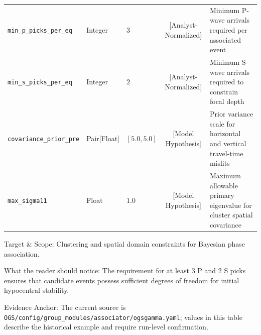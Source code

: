 \begin{table}[htbp]
\begin{threeparttable}
\begin{tabularx}{\linewidth}{l l l c X}
      \texttt{min\_p\_picks\_per\_eq} & Integer & $3$ & [Analyst-Normalized] & Minimum P-wave arrivals required per associated event \\
      \texttt{min\_s\_picks\_per\_eq} & Integer & $2$ & [Analyst-Normalized] & Minimum S-wave arrivals required to constrain focal depth \\
      \texttt{covariance\_prior\_pre} & Pair[Float] & $[5.0, 5.0]$ & [Model Hypothesis] & Prior variance scale for horizontal and vertical travel-time misfits \\
      \texttt{max\_sigma11} & Float & $1.0$ & [Model Hypothesis] & Maximum allowable primary eigenvalue for cluster spatial covariance \\
      \bottomrule
    \end{tabularx}
    \begin{tablenotes}[flushleft]
      \footnotesize
      \item Target \& Scope: Clustering and spatial domain constraints for Bayesian phase association.
      \item What the reader should notice: The requirement for at least 3 P and 2 S picks ensures that candidate events possess sufficient degrees of freedom for initial hypocentral stability.
      \item Evidence Anchor: The current source is \texttt{OGS/config/group\_modules/associator/ogsgamma.yaml}; values in this table describe the historical example and require run-level confirmation.
    \end{tablenotes}
  \end{threeparttable}
\end{table}

